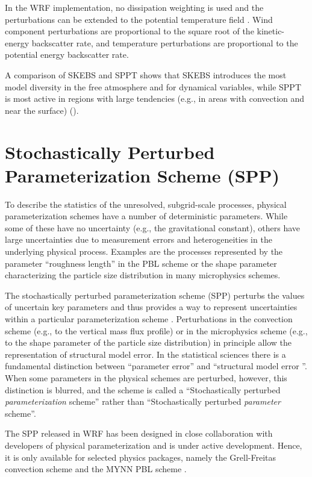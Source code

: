 In the WRF implementation, no dissipation weighting is used and the 
perturbations can be extended to the potential temperature field \citep{Be11}.
Wind component perturbations are proportional to the square
root of the kinetic-energy backscatter rate, and temperature
perturbations are proportional to the potential energy backscatter rate.

A comparison of SKEBS and SPPT shows that SKEBS introduces the most model 
diversity in the free atmosphere and for dynamical variables, 
while SPPT is most active in regions with large tendencies (e.g., in areas with convection 
and near the surface) (\citep{Be15}).
\section {Stochastically Perturbed Parameterization Scheme (SPP)}
To describe the statistics of the unresolved, subgrid-scale processes, 
physical parameterization schemes have a number of deterministic parameters.
While some of these have no uncertainty (e.g., the gravitational constant), 
others have large uncertainties due to 
measurement errors and heterogeneities in the underlying physical process.
Examples are the processes represented by the parameter ``roughness length'' in the PBL 
scheme or the shape parameter characterizing the particle size distribution in 
many microphysics schemes.  

The stochastically perturbed parameterization scheme (SPP)
perturbs the values of uncertain key parameters and thus provides 
a way to represent uncertainties within a particular parameterization scheme
\citep{Bo08,Ha11a}.
Perturbations in the convection scheme (e.g., to the vertical mass flux 
profile) or in the microphysics scheme (e.g., to the shape parameter of 
the particle size distribution) in principle allow the representation of
structural model error.  In the statistical sciences there is a fundamental 
distinction between ``parameter error'' and 
``structural model error ''. When some parameters in the physical schemes 
are perturbed, however, this distinction is blurred, and the scheme is 
called a ``Stochastically perturbed {\it parameterization} scheme''
rather than ``Stochastically perturbed {\it parameter} scheme''. 

The SPP released in WRF has been designed in close collaboration with 
developers of physical parameterization and is under active development. 
Hence, it is only
available for selected physics packages, namely the Grell-Freitas convection
scheme and the MYNN PBL scheme \citep{jankov2017performance}.

